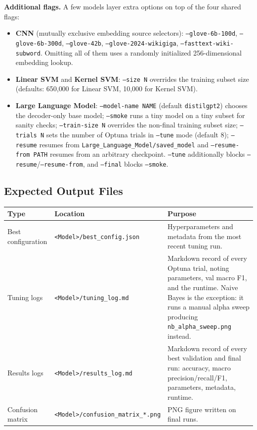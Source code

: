 \documentclass[12pt]{article}
\begin{document}
\textbf{Additional flags.} A few models layer extra options on top of the four shared flags:
\begin{itemize}
    \item \textbf{CNN} (mutually exclusive embedding source selectors): \texttt{--glove-6b-100d}, \texttt{--glove-6b-300d}, \texttt{--glove-42b}, \texttt{--glove-2024-wikigiga}, \texttt{--fasttext-wiki-subword}. Omitting all of them uses a randomly initialized 256-dimensional embedding lookup.
    \item \textbf{Linear SVM} and \textbf{Kernel SVM}: \texttt{--size N} overrides the training subset size (defaults: 650{,}000 for Linear SVM, 10{,}000 for Kernel SVM).
    \item \textbf{Large Language Model}: \texttt{--model-name NAME} (default \texttt{distilgpt2}) chooses the decoder-only base model; \texttt{--smoke} runs a tiny model on a tiny subset for sanity checks; \texttt{--train-size N} overrides the non-final training subset size; \texttt{--trials N} sets the number of Optuna trials in \texttt{--tune} mode (default 8); \texttt{--resume} resumes from \texttt{Large\_Language\_Model/saved\_model} and \texttt{--resume-from PATH} resumes from an arbitrary checkpoint. \texttt{--tune} additionally blocks \texttt{--resume}/\texttt{--resume-from}, and \texttt{--final} blocks \texttt{--smoke}.
\end{itemize}

\subsection{Expected Output Files}

\begin{longtable}{p{} p{} p{}}
    \toprule
    Type                     & Location & Purpose \\
    \midrule
    Best configuration       & \texttt{<Model>/best\_config.json} & Hyperparameters and metadata from the most recent tuning run. \\
    Tuning logs              & \texttt{<Model>/tuning\_log.md} & Markdown record of every Optuna trial, noting parameters, val macro F1, and the runtime. Naive Bayes is the exception: it runs a manual alpha sweep producing \texttt{nb\_alpha\_sweep.png} instead. \\
    Results logs             & \texttt{<Model>/results\_log.md} & Markdown record of every best validation and final run: accuracy, macro precision/recall/F1, parameters, metadata, runtime. \\
    Confusion matrix  & \texttt{<Model>/confusion\_matrix\_*.png} & PNG figure written on final runs. \\
    \bottomrule
\end{longtable}
\end{document}
